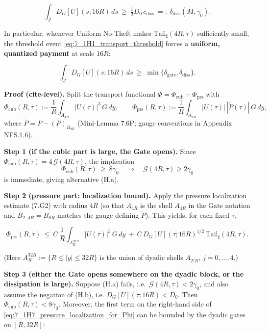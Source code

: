 \documentclass[
  11pt,
]{article}
\begin{document}
\begin{equation}
\int_{J}D_G[U](s;16R)\,ds\ \ge\ \tfrac12 D_0\,c_{\mathrm{diss}}
\ =:\ \delta_{\mathrm{diss}}(M,\gamma_0).
\tag{7.1H5}\label{eq:7_1H5_direct_dissipation_packet}
\end{equation}

In particular, whenever Uniform No-Theft makes \(\mathrm{Tail}_\sharp(4R,\tau)\) sufficiently small, the threshold event \eqref{eq:7_1H1_transport_threshold} forces a \textbf{uniform, quantized payment} at scale \(16R\):

\begin{equation}
\int_{J}D_G[U](s;16R)\,ds\ \ge\ \min\{\delta_{\mathrm{gate}},\delta_{\mathrm{diss}}\}.
\tag{7.1H6}\label{eq:7_1H6_transport_forces_payment}
\end{equation}

\textbf{Proof (cite-level).} Split the transport functional \(\Phi=\Phi_{\mathrm{cub}}+\Phi_{\mathrm{prs}}\) with \[
\Phi_{\mathrm{cub}}(R,\tau):=\frac1R\int_{A_{4R}}|U(\tau)|^3\,G\,dy,
\qquad
\Phi_{\mathrm{prs}}(R,\tau):=\frac1R\int_{A_{4R}}|U(\tau)|\,|\widetilde P(\tau)|\,G\,dy,
\] where \(\widetilde P=P-(P)_{B_{8R}}\) (Mini-Lemma 7.6P; gauge conventions in Appendix NFS.1.6).

\textbf{Step 1 (if the cubic part is large, the Gate opens).} Since \(\Phi_{\mathrm{cub}}(R,\tau)=4\,\mathcal G(4R,\tau)\), the implication \[
\Phi_{\mathrm{cub}}(R,\tau)\ \ge\ 8\gamma_0\quad\Rightarrow\quad \mathcal G(4R,\tau)\ge 2\gamma_0
\] is immediate, giving alternative (H.a).

\textbf{Step 2 (pressure part: localization bound).} Apply the pressure localization estimate (7.G2) with radius \(4R\) (so that \(A_{4R}\) is the shell \(A_{4R}\) in the Gate notation and \(B_{2\cdot 4R}=B_{8R}\) matches the gauge defining \(\widetilde P\)). This yields, for each fixed \(\tau\),

\begin{equation}
\Phi_{\mathrm{prs}}(R,\tau)
\ \le\
C\,\frac1R\int_{A_{R}^{32R}}|U(\tau)|^3\,G\,dy
\ +\
C\,D_G[U](\tau;16R)^{1/2}\,\mathrm{Tail}_\sharp(4R,\tau).
\tag{7.1H7}\label{eq:7_1H7_pressure_localization_for_Phi}
\end{equation}

(Here \(A_{R}^{32R}:=\{R\le |y|\le 32R\}\) is the union of dyadic shells \(A_{2^jR}\), \(j=0,\dots,4\).)

\textbf{Step 3 (either the Gate opens somewhere on the dyadic block, or the dissipation is large).} Suppose (H.a) fails, i.e.~\(\mathcal G(4R,\tau)<2\gamma_0\), and also assume the negation of (H.b), i.e. \(D_G[U](\tau;16R)<D_0\). Then \(\Phi_{\mathrm{cub}}(R,\tau)<8\gamma_0\). Moreover, the first term on the right-hand side of \eqref{eq:7_1H7_pressure_localization_for_Phi} can be bounded by the dyadic gates on \([R,32R]\):
\end{document}
